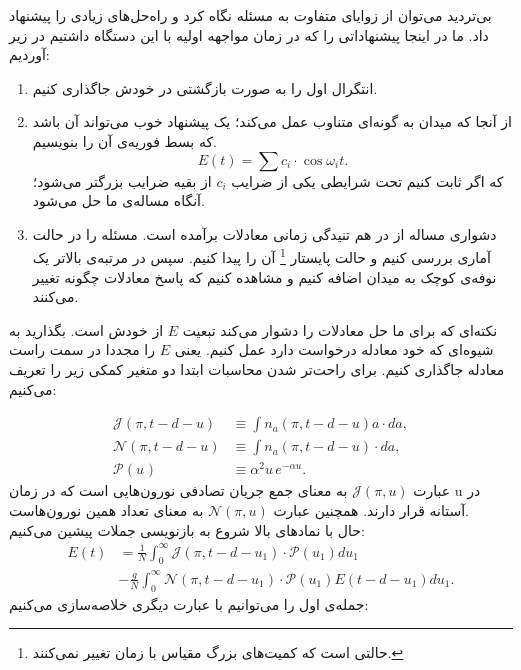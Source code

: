بی‌تردید می‌توان از زوایای متفاوت به مسئله نگاه کرد و راه‌حل‌های زیادی را پیشنهاد داد. ما در اینجا پیشنهاداتی را که در زمان مواجهه اولیه با این دستگاه داشتیم در زیر آوردیم:
\begin{enumerate}[1.]
	\item
انتگرال اول را به صورت بازگشتی در خودش جاگذاری کنیم.
	\item
	از آنجا که میدان به گونه‌ای متناوب عمل می‌کند؛ یک پیشنهاد خوب می‌تواند آن باشد که بسط فوریه‌ی آن را بنویسیم.
	\begin{equation}
		E(t) = \sum c_i \cdot \cos \omega_i t .
	\end{equation}
	که اگر ثابت کنیم تحت شرایطی یکی از ضرایب
	 $c_i$
	 از بقیه ضرایب بزرگتر می‌شود؛ آنگاه مساله‌ی ما حل می‌شود.
	\item
	دشواری مساله از در هم تنیدگی زمانی معادلات برآمده است. مسئله را در حالت آماری بررسی کنیم و حالت پایستار 
	\footnote{حالتی است که کمیت‌های بزرگ مقیاس با زمان تغییر نمی‌کنند.}
	آن را پیدا کنیم. سپس در مرتبه‌ی بالاتر یک نوفه‌ی کوچک به میدان اضافه کنیم و مشاهده کنیم که پاسخ معادلات چگونه تغییر می‌کنند.
\end{enumerate}



نکته‌ای که برای ما حل معادلات را دشوار می‌کند تبعیت $E$ از خودش است. بگذارید به شیوه‌ای که خود معادله درخواست دارد عمل کنیم. یعنی $E$ را مجددا در سمت راست معادله جاگذاری کنیم. برای راحت‌تر شدن محاسبات ابتدا دو متغیر کمکی زیر را تعریف می‌کنیم:
\newcommand{\J}[1]{\mathcal{J}(\pi,#1)}
\newcommand{\N}[1]{\mathcal{N}(\pi, #1)}
\newcommand{\Pexp}[1]{\mathcal{P}(u_{#1})}

\newcommand{\A}[1]{\mathcal{A}(#1)}

%
\begin{align}
	\J{t-d-u} &\equiv \int n_a(\pi,t-d-u) a \cdot da ,\\
	\N{t-d-u} &\equiv \int n_a(\pi,t-d-u) \cdot da ,\\
	\Pexp{} &\equiv \alpha^2 u\, e^{-\alpha u} .
\end{align}
عبارت $\J{u}$ به معنای جمع جریان تصادفی نورون‌هایی است که در زمان u در آستانه قرار دارند. همچنین عبارت $\N{u}$ به معنای تعداد همین نورون‌هاست.\\
حال با نمادهای بالا شروع به بازنویسی جملات پیشین می‌کنیم:
\begin{align}
	E(t) &= \frac{1}{N} \int_{0}^{\infty} \J{t-d-u_1} \cdot \Pexp{1} du_1\\
	 &-\frac{g}{N}\int_{0}^{\infty} \N{t-d-u_1} \cdot \Pexp{1} E(t-d-u_1)  du_1 .
	 \label{eq:field_zeroth_step}
\end{align}
 جمله‌ی اول را می‌توانیم با عبارت دیگری خلاصه‌سازی می‌کنیم:

